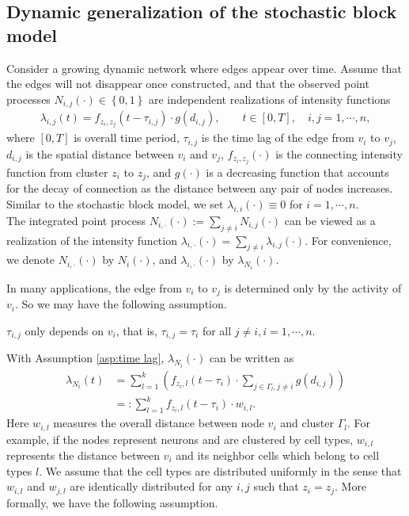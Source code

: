 \subsection{Dynamic generalization of the stochastic block model}
Consider a growing dynamic network where edges appear over time. 
Assume that the edges will not disappear once constructed,
and that the observed point processes ${N}_{i,j}(\cdot)\in \left\{ 0,1 \right\}$ are independent realizations of intensity functions 
\begin{align*}
\lambda_{i,j}(t)=f_{z_i,z_j}(t-\tau_{i,j})\cdot g(d_{i,j}), \qquad t\in[0,T],\quad i,j=1,\cdots,n, 
\end{align*}
where $[0,T]$ is overall time period,
$\tau_{i,j}$ is the time lag of the edge from $v_i$ to $v_j$, 
 $d_{i,j}$ is the spatial distance between $v_i$ and $v_j$, $f_{z_i,z_j}(\cdot)$ is the connecting intensity function from cluster $z_i$ to $z_j$, and $g(\cdot)$ is a decreasing function that accounts for the decay of connection as the distance between any pair of nodes increases.
Similar to the stochastic block model, we set $\lambda_{i,i}(\cdot)\equiv 0$ for $i=1,\cdots,n$.
\\
The integrated point process $N_{i,\cdot}(\cdot):=\sum_{j\neq i} N_{i,j}(\cdot)$ can be viewed as a realization of the intensity function $\lambda_{i,\cdot}(\cdot)=\sum_{j\neq i}\lambda_{i,j}(\cdot)$.
For convenience, we denote $N_{i,\cdot}(\cdot)$ by $N_i(\cdot)$, and $\lambda_{i,\cdot}(\cdot)$ by $\lambda_{N_i}(\cdot)$. 

In many applications, the edge from $v_i$ to $v_j$ is determined only by the activity of $v_i$. 
So we may have the following assumption.
\begin{assumption}\label{asp:time lag}
$\tau_{i,j}$ only depends on $v_i$, that is,
$\tau_{i,j}=\tau_i $ for all $j\neq i, i=1,\cdots,n$.
\end{assumption}
\noindent With Assumption \ref{asp:time lag}, $\lambda_{N_i}(\cdot)$ can be written as
\begin{align*}
\lambda_{N_i}(t) &= \sum_{l=1}^k \left( f_{z_i,l}(t-\tau_i)\cdot \sum_{j\in\Gamma_l,j\neq i}g(d_{i,j}) \right) \\
&=: \sum_{l=1}^k  f_{z_i,l}(t-\tau_i)\cdot w_{i,l}.
\end{align*}
Here $w_{i,l}$ measures the overall distance between node $v_i$ and cluster $\Gamma_l$. 
For example, if the nodes represent neurons and are clustered by cell types, $w_{i,l}$ represents the distance between $v_i$ and its neighbor cells  which belong to cell types $l$.
We assume that the cell types are distributed uniformly in the sense that $w_{i,l}$ and $w_{j,l}$ are identically distributed for any $i, j$ such that $z_i=z_j$.
More formally, we have the following assumption.

